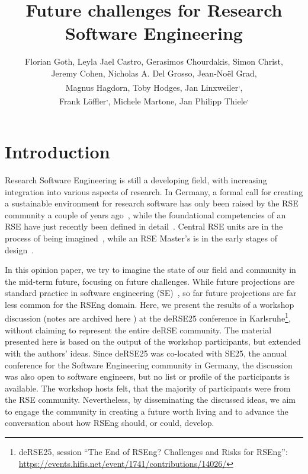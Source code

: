 \documentclass{eceasst}
\title{Future challenges for Research Software Engineering} %
\author{
Florian Goth\authorOrcid{0000-0003-2707-4790}\authorRef{1},
Leyla Jael Castro\authorOrcid{0000-0003-3986-0510}\authorRef{2},
Gerasimos Chourdakis\authorOrcid{0000-0002-3977-1385}\authorRef{3},
Simon Christ\authorOrcid{0000-0002-5866-1472}\authorRef{4},
\texorpdfstring{\\}{} %
Jeremy Cohen\authorOrcid{0000-0003-4312-2537}\authorRef{5},
Nicholas A. Del Grosso\thinspace\authorRef{6},
Jean-Noël Grad\authorOrcid{0000-0002-5821-4912}\authorRef{7},
\texorpdfstring{\\}{} %
Magnus Hagdorn\authorOrcid{0000-0002-5076-4864}\authorRef{8},
Toby Hodges\authorOrcid{0000-0003-1766-456X}\authorRef{9},
Jan Linxweiler\authorOrcid{0000-0002-2755-5087}\authorRef{10}\textsuperscript{,}\authorRef{11},
\texorpdfstring{\\}{} %
Frank Löffler\authorOrcid{0000-0001-6643-6323}\authorRef{12}\textsuperscript{,}\authorRef{11},
Michele Martone\authorOrcid{0000-0003-3239-8554}\authorRef{13},
Jan Philipp Thiele\authorOrcid{0000-0002-8901-6660}\authorRef{10}\textsuperscript{,}\authorRef{14}
} %
\institute{%
\autlabel{1} Institut für theoretische Physik 1, University of Würzburg, 97074, Würzburg, Germany\\
\autlabel{2} ZB MED Information Centre for Life Sciences, Cologne, Germany\\
\autlabel{3} Institute for Parallel and Distributed Systems, University of Stuttgart, Stuttgart, Germany\\
\autlabel{4} Leibniz University Hannover, Department of Cell Biology and Biophysics, Computational Biology, Germany\\
\autlabel{5} Imperial College London, London, UK\\
\autlabel{6} Institute for Experimental Epileptology and Cognition Research, Uniklinikum Bonn, Germany\\
\autlabel{7} Institute for Computational Physics, University of Stuttgart, Germany\\
\autlabel{8} Geschäftsbereich IT, Charité Universitätsmedizin Berlin, Germany\\
\autlabel{9} The Carpentries, USA\\
\autlabel{10} Technische Universität Braunschweig, Germany\\
\autlabel{11} de-RSE e.V.---Society for Research Software in Germany\\
\autlabel{12} Competence Center Digital Research, Friedrich Schiller University Jena, Germany\\
\autlabel{13} Independent researcher, Germany\\
\autlabel{14} Weierstrass Institute, Berlin, Germany;
              Leibniz University Hannover, Institute of Applied Mathematics, Scientific Computing, Hannover, Germany\\
}
\begin{document}
\maketitle

\section{Introduction}

Research Software Engineering is still a developing field,
with increasing integration into various aspects of research.
In Germany, a formal call for creating a sustainable environment for research software has only been raised by the RSE community a couple of years ago~\cite{Anzt2021},
while the foundational competencies of an RSE have just recently been defined in detail~\cite{Goth2024}.
Central RSE units are in the process of being imagined~\cite{Kempf2025-draft},
while an RSE Master's is in the early stages of design~\cite{Dehne2025-draft}.

In this opinion paper, we try to imagine the state of our field
and community in the mid-term future, focusing on future challenges.
While future projections are standard practice in software engineering (SE)~\cite{Katz2023,Khan2021,Hu2023,Bosch2016a,Boehm2011},
so far future projections are far less common for the RSEng domain.
Here, we present the results of a workshop discussion (notes are archived here \cite{goth2025_WSPad}) at the
deRSE25 conference in Karlsruhe\footnote{deRSE25, session ``The End of {RSEng}?
Challenges and Risks for {RSEng}'': \url{https://events.hifis.net/event/1741/contributions/14026/}},
without claiming to represent the entire deRSE community.
The material presented here is based on the output of the workshop participants, but extended with the authors' ideas.
Since deRSE25 was co-located with SE25, the annual conference for the Software Engineering community in Germany, the discussion was also open to software engineers,
but no list or profile of the participants is available.
The workshop hosts felt, that the majority of participants were from the RSE community.
Nevertheless, by disseminating the discussed ideas,
we aim to engage the community in creating a future worth living
and to advance the conversation about how RSEng should, or could, develop.
\end{document}
